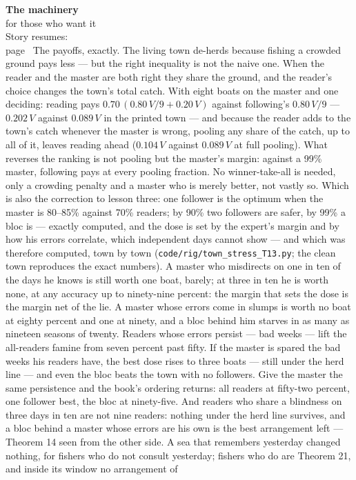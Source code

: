\begin{machinery}{\textbf{The machinery}\\for those who want it\\[3pt]{\color{muted}Story resumes:\\page~\pageref{ch12}}}
The payoffs, exactly. The living town
de-herds because fishing a crowded ground pays less --- but the right
inequality is not the naive one. When the reader and the master are
both right they share the ground, and the reader's choice changes the
town's total catch. With eight boats on the master and one deciding:
reading pays \(0.70\,(0.80\,V/9 + 0.20\,V)\) against following's \(0.80\,V/9\) --- \(0.202\,V\) against \(0.089\,V\) in the printed town --- and because the reader
adds to the town's catch whenever the master is wrong, pooling any
share of the catch, up to all of it, leaves reading ahead (\(0.104\,V\) against \(0.089\,V\) at full pooling). What reverses the ranking is not
pooling but the master's margin: against a 99\% master, following pays
at every pooling fraction. No winner-take-all is needed, only a
crowding penalty and a master who is merely better, not vastly so.
Which is also the correction to lesson three: one follower is the
optimum when the master is 80--85\% against 70\% readers; by 90\% two
followers are safer, by 99\% a bloc is --- exactly computed, and the dose
is set by the expert's margin and by how his errors correlate, which
independent days cannot show --- and which was therefore computed, town
by town (\texttt{code/\allowbreak{}rig/\allowbreak{}town\_\allowbreak{}stress\_\allowbreak{}T13.\allowbreak{}py}; the clean town reproduces the
exact numbers). A master who misdirects on one in ten of the days he
knows is still worth one boat, barely; at three in ten he is worth
none, at any accuracy up to ninety-nine percent: the margin that sets
the dose is the margin net of the lie. A master whose errors come in
slumps is worth no boat at eighty percent and one at ninety, and a
bloc behind him starves in as many as nineteen seasons of twenty. Readers whose
errors persist --- bad weeks --- lift the all-readers famine from seven
percent past fifty. If the master is spared the bad weeks his readers
have, the best dose rises to three boats --- still under the herd line ---
and even the bloc beats the town with no followers. Give the master
the same persistence and the book's ordering returns: all readers at
fifty-two percent, one follower best, the bloc at ninety-five. And
readers who share a blindness on three days in
ten are not nine readers: nothing under the herd line survives, and a
bloc behind a master whose errors are his own is the best arrangement
left --- Theorem 14 seen from the other side. A sea that remembers
yesterday changed nothing, for fishers who do not consult yesterday;
fishers who do are Theorem 21, and inside its window no arrangement of

\end{machinery}
